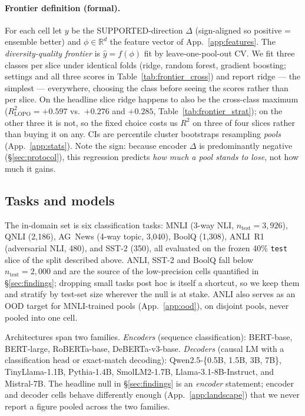 \documentclass[11pt]{article}
\begin{document}
\paragraph{Frontier definition (formal).} For each cell let $y$ be the SUPPORTED-direction $\Delta$ (sign-aligned so positive = ensemble better) and $\phi\!\in\!\mathbb{R}^{d}$ the feature vector of App.~\ref{app:features}. The \emph{diversity-quality frontier} is $\hat y = f(\phi)$ fit by leave-one-pool-out CV. We fit three classes per slice under identical folds (ridge, random forest, gradient boosting; settings and all three scores in Table~\ref{tab:frontier_cross}) and report ridge --- the simplest --- everywhere, choosing the class before seeing the scores rather than per slice. On the headline slice ridge happens to also be the cross-class maximum ($R^2_{\text{LOPO}}{=}{+}0.597$ vs.\ ${+}0.276$ and ${+}0.285$, Table~\ref{tab:frontier_strat}); on the other three it is not, so the fixed choice costs us $R^2$ on three of four slices rather than buying it on any. CIs are percentile cluster bootstraps resampling \emph{pools} (App.~\ref{app:stats}). Note the sign: because encoder $\Delta$ is predominantly negative (\S\ref{sec:protocol}), this regression predicts \emph{how much a pool stands to lose}, not how much it gains.



\subsection{Tasks and models}

The in-domain set is six classification tasks: MNLI (3-way NLI, $n_{\text{test}}{=}3{,}926$), QNLI (2{,}186), AG~News (4-way topic, 3{,}040), BoolQ (1{,}308), ANLI~R1 (adversarial NLI, 480), and SST-2 (350), all evaluated on the frozen 40\% \texttt{test} slice of the split described above. ANLI, SST-2 and BoolQ fall below $n_{\text{test}}{=}2{,}000$ and are the source of the low-precision cells quantified in \S\ref{sec:findings}; dropping small tasks post hoc is itself a shortcut, so we keep them and stratify by test-set size wherever the null is at stake. ANLI also serves as an OOD target for MNLI-trained pools (App.~\ref{app:ood}), on disjoint pools, never pooled into one cell.

Architectures span two families. \emph{Encoders} (sequence classification): BERT-base, BERT-large, RoBERTa-base, DeBERTa-v3-base. \emph{Decoders} (causal LM with a classification head or exact-match decoding): Qwen2.5-\{0.5B, 1.5B, 3B, 7B\}, TinyLlama-1.1B, Pythia-1.4B, SmolLM2-1.7B, Llama-3.1-8B-Instruct, and Mistral-7B. The headline null in \S\ref{sec:findings} is an \emph{encoder} statement; encoder and decoder cells behave differently enough (App.~\ref{app:landscape}) that we never report a figure pooled across the two families.
\end{document}

